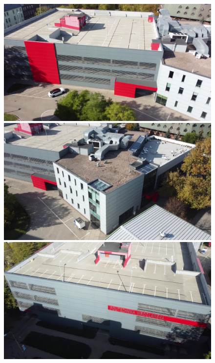 \begin{figure}[h!]
    \centering
    \begin{minipage}{0.24\textwidth}
        \centering
        \includegraphics[width=\textwidth]{img/sks_dataset_1.jpg}
    \end{minipage}
    \hfill
    \begin{minipage}{0.24\textwidth}
        \centering
        \includegraphics[width=\textwidth]{img/sks_dataset_2.jpg}
    \end{minipage}
    \hfill
    \begin{minipage}{0.24\textwidth}
        \centering
        \includegraphics[width=\textwidth]{img/sks_dataset_3.jpg}

\end{minipage}
\end{figure}
